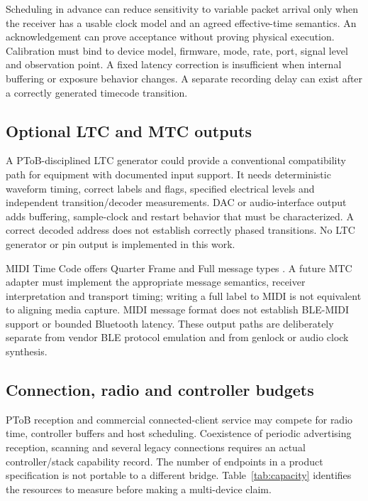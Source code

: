 \documentclass[11pt,letterpaper]{article}
\begin{document}
Scheduling in advance can reduce sensitivity to variable packet arrival only when the receiver has a usable clock model and an agreed effective-time semantics. An acknowledgement can prove acceptance without proving physical execution. Calibration must bind to device model, firmware, mode, rate, port, signal level and observation point. A fixed latency correction is insufficient when internal buffering or exposure behavior changes. A separate recording delay can exist after a correctly generated timecode transition.

\subsection{Optional LTC and MTC outputs}
A PToB-disciplined LTC generator could provide a conventional compatibility path for equipment with documented input support. It needs deterministic waveform timing, correct labels and flags, specified electrical levels and independent transition/decoder measurements. DAC or audio-interface output adds buffering, sample-clock and restart behavior that must be characterized. A correct decoded address does not establish correctly phased transitions. No LTC generator or pin output is implemented in this work.

MIDI Time Code offers Quarter Frame and Full message types \cite{midi}. A future MTC adapter must implement the appropriate message semantics, receiver interpretation and transport timing; writing a full label to MIDI is not equivalent to aligning media capture. MIDI message format does not establish BLE-MIDI support or bounded Bluetooth latency. These output paths are deliberately separate from vendor BLE protocol emulation and from genlock or audio clock synthesis.

\subsection{Connection, radio and controller budgets}
PToB reception and commercial connected-client service may compete for radio time, controller buffers and host scheduling. Coexistence of periodic advertising reception, scanning and several legacy connections requires an actual controller/stack capability record. The number of endpoints in a product specification is not portable to a different bridge. Table~\ref{tab:capacity} identifies the resources to measure before making a multi-device claim.
\end{document}
